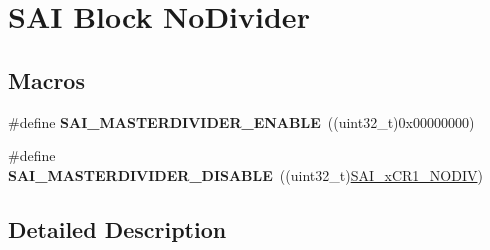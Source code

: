 \hypertarget{group___s_a_i___block___no_divider}{}\section{S\+AI Block No\+Divider}
\label{group___s_a_i___block___no_divider}
\subsection*{Macros}
\begin{DoxyCompactItemize}
\item 
\#define {\bfseries S\+A\+I\+\_\+\+M\+A\+S\+T\+E\+R\+D\+I\+V\+I\+D\+E\+R\+\_\+\+E\+N\+A\+B\+LE}~((uint32\+\_\+t)0x00000000)\hypertarget{group___s_a_i___block___no_divider_ga4600250a0cd5fdd22d20daee8830c922}{}\label{group___s_a_i___block___no_divider_ga4600250a0cd5fdd22d20daee8830c922}

\item 
\#define {\bfseries S\+A\+I\+\_\+\+M\+A\+S\+T\+E\+R\+D\+I\+V\+I\+D\+E\+R\+\_\+\+D\+I\+S\+A\+B\+LE}~((uint32\+\_\+t)\hyperlink{group___peripheral___registers___bits___definition_ga98132c4a713c61f232c51b5c5e73622d}{S\+A\+I\+\_\+x\+C\+R1\+\_\+\+N\+O\+D\+IV})\hypertarget{group___s_a_i___block___no_divider_gaa46306360e7a84b87f292156055dd1ab}{}\label{group___s_a_i___block___no_divider_gaa46306360e7a84b87f292156055dd1ab}

\end{DoxyCompactItemize}


\subsection{Detailed Description}
